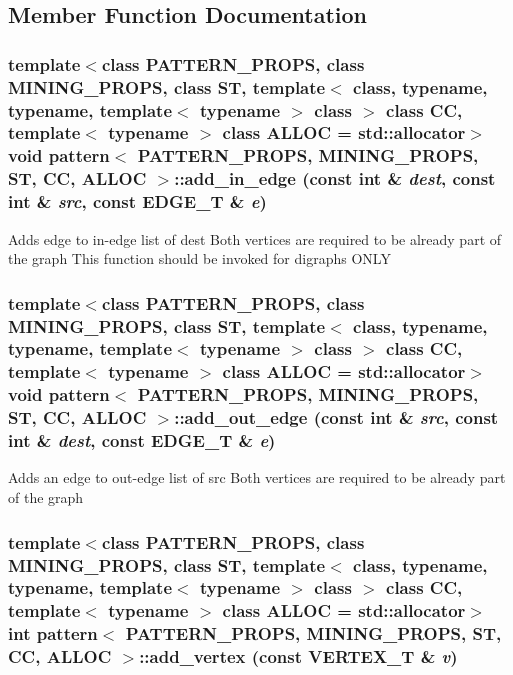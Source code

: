 \subsection{Member Function Documentation}
\subsubsection{\setlength{\rightskip}{0pt plus 5cm}template$<$class PATTERN\_\-PROPS, class MINING\_\-PROPS, class ST, template$<$ class, typename, typename, template$<$ typename $>$ class $>$ class CC, template$<$ typename $>$ class ALLOC = std::allocator$>$ void \bf{pattern}$<$ PATTERN\_\-PROPS, MINING\_\-PROPS, ST, CC, ALLOC $>$::add\_\-in\_\-edge (const int \& {\em dest}, const int \& {\em src}, const EDGE\_\-T \& {\em e})\hspace{0.3cm}{\tt  [inline]}}\label{classpattern_40590cc9a4598df65983f7716aa3c7fa}


Adds edge to in-edge list of dest Both vertices are required to be already part of the graph This function should be invoked for digraphs ONLY 
\subsubsection{\setlength{\rightskip}{0pt plus 5cm}template$<$class PATTERN\_\-PROPS, class MINING\_\-PROPS, class ST, template$<$ class, typename, typename, template$<$ typename $>$ class $>$ class CC, template$<$ typename $>$ class ALLOC = std::allocator$>$ void \bf{pattern}$<$ PATTERN\_\-PROPS, MINING\_\-PROPS, ST, CC, ALLOC $>$::add\_\-out\_\-edge (const int \& {\em src}, const int \& {\em dest}, const EDGE\_\-T \& {\em e})\hspace{0.3cm}{\tt  [inline]}}\label{classpattern_ac5dd176b16659ebd9fc665a1a77eea2}


Adds an edge to out-edge list of src Both vertices are required to be already part of the graph 
\subsubsection{\setlength{\rightskip}{0pt plus 5cm}template$<$class PATTERN\_\-PROPS, class MINING\_\-PROPS, class ST, template$<$ class, typename, typename, template$<$ typename $>$ class $>$ class CC, template$<$ typename $>$ class ALLOC = std::allocator$>$ int \bf{pattern}$<$ PATTERN\_\-PROPS, MINING\_\-PROPS, ST, CC, ALLOC $>$::add\_\-vertex (const VERTEX\_\-T \& {\em v})\hspace{0.3cm}{\tt  [inline]}}\label{classpattern_a7a0c9e586643031469f44d15ead5d37}


